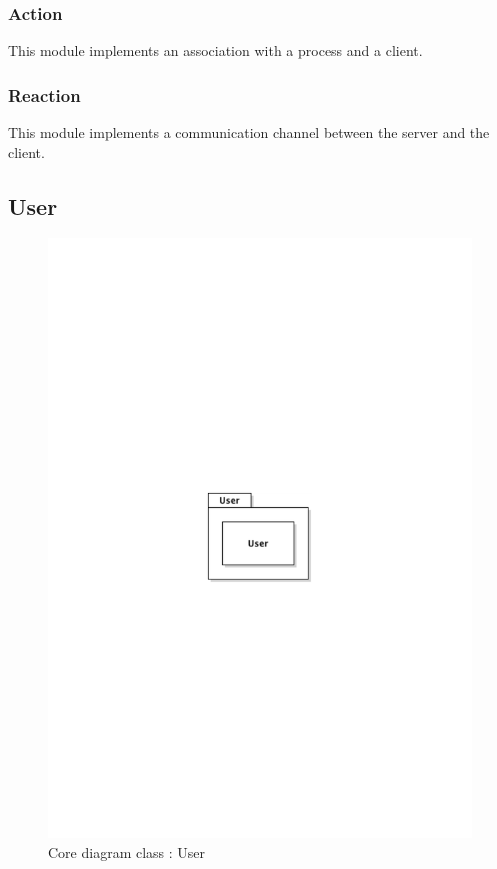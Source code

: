 		\subsubsection{Action}
			This module implements an association with a process and a client.
		\subsubsection{Reaction}
			This module implements a communication channel between the server and the client.

	\subsection{User}
		\begin{figure}[ht]
			\begin{center}
				\includegraphics[width=\textwidth,  trim=2cm 12cm 2cm 12cm]{UML_figure/DC/core/user/DC_User.pdf}
				\caption{Core diagram class : User}
			\end{center}
		\end{figure}
